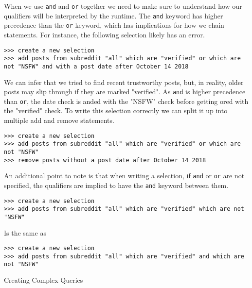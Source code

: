 When we use \texttt{and} and \texttt{or} together we need to make sure to understand how our qualifiers will be interpreted by the runtime. The \texttt{and} keyword has higher precedence than the \texttt{or} keyword, which has implications for how we chain statements. For instance, the following selection likely has an error.
\newline\begin{minipage}{\linewidth}\begin{lstlisting}
>>> create a new selection
>>> add posts from subreddit "all" which are "verified" or which are not "NSFW" and with a post date after October 14 2018
\end{lstlisting}\end{minipage}
We can infer that we tried to find recent trustworthy posts, but, in reality, older posts may slip through if they are marked "verified". As \texttt{and} is higher precedence than \texttt{or}, the date check is anded with the "NSFW" check before getting ored with the "verified" check. To write this selection correctly we can split it up into multiple add and remove statements.
\newline\begin{minipage}{\linewidth}\begin{lstlisting}
>>> create a new selection
>>> add posts from subreddit "all" which are "verified" or which are not "NSFW"
>>> remove posts without a post date after October 14 2018
\end{lstlisting}\end{minipage}
An additional point to note is that when writing a selection, if \texttt{and} or \texttt{or} are not specified, the qualifiers are implied to have the \texttt{and} keyword between them.
\newline\begin{minipage}{\linewidth}\begin{lstlisting}
>>> create a new selection
>>> add posts from subreddit "all" which are "verified" which are not "NSFW"
\end{lstlisting}\end{minipage}
Is the same as
\newline\begin{minipage}{\linewidth}\begin{lstlisting}
>>> create a new selection
>>> add posts from subreddit "all" which are "verified" and which are not "NSFW"
\end{lstlisting}\end{minipage}
Creating Complex Queries
